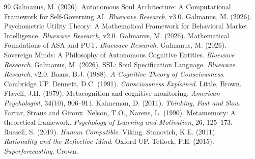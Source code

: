 \documentclass[12pt,a4paper]{article}
\theoremstyle{plain}
\theoremstyle{definition}
\theoremstyle{remark}
\begin{document}
\begin{thebibliography}{99}
 Galmanus, M. (2026). Autonomous Soul Architecture: A Computational Framework for Self-Governing AI. \textit{Bluewave Research}, v3.0.
 Galmanus, M. (2026). Psychometric Utility Theory: A Mathematical Framework for Behavioral Market Intelligence. \textit{Bluewave Research}, v2.0.
 Galmanus, M. (2026). Mathematical Foundations of ASA and PUT. \textit{Bluewave Research}.
 Galmanus, M. (2026). Sovereign Minds: A Philosophy of Autonomous Cognitive Entities. \textit{Bluewave Research}.
 Galmanus, M. (2026). SSL: Soul Specification Language. \textit{Bluewave Research}, v2.0.
 Baars, B.J. (1988). \textit{A Cognitive Theory of Consciousness}. Cambridge UP.
 Dennett, D.C. (1991). \textit{Consciousness Explained}. Little, Brown.
 Flavell, J.H. (1979). Metacognition and cognitive monitoring. \textit{American Psychologist}, 34(10), 906--911.
 Kahneman, D. (2011). \textit{Thinking, Fast and Slow}. Farrar, Straus and Giroux.
 Nelson, T.O., Narens, L. (1990). Metamemory: A theoretical framework. \textit{Psychology of Learning and Motivation}, 26, 125--173.
 Russell, S. (2019). \textit{Human Compatible}. Viking.
 Stanovich, K.E. (2011). \textit{Rationality and the Reflective Mind}. Oxford UP.
 Tetlock, P.E. (2015). \textit{Superforecasting}. Crown.
\end{thebibliography}
\end{document}
